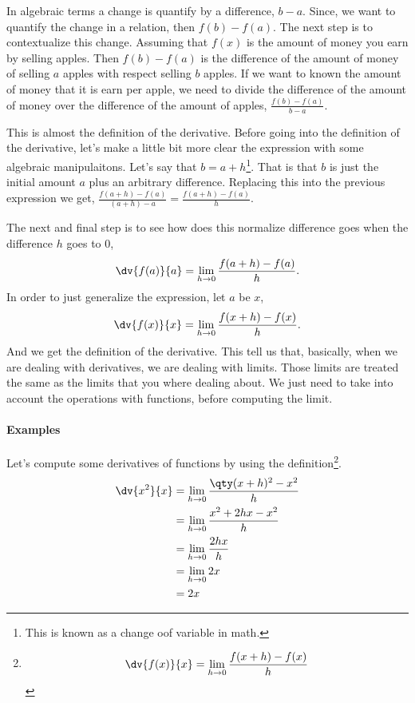 \documentclass[../main-notes.tex]{subfile}
\begin{document}
In algebraic terms a change is quantify by a difference, \(b-a\).
Since, we want to quantify the change in a relation, then \(f(b) - f(a)\).
The next step is to contextualize this change.
Assuming that $f(x)$ is the amount of money you earn by selling apples.
Then $f(b) - f(a)$ is the difference of the amount of money of selling $a$ apples with respect selling $b$ apples.
If we want to known the amount of money that it is earn per apple, we need to divide the difference of the amount of money over the difference of the amount of apples, \(\frac{f(b)-f(a)}{b-a}\).

This is almost the definition of the derivative.
Before going into the definition of the derivative, let's make a little bit more clear the expression with some algebraic manipulaitons.
Let's say that $b=a+h$\footnote{This is known as a change oof variable in math.}.
That is that $b$ is just the initial amount $a$ plus an arbitrary difference.
Replacing this into the previous expression we get, \(\frac{f(a+h) - f(a)}{(a+h)-a} = \frac{f(a+h) - f(a)}{h}\).

The next and final step is to see how does this normalize difference goes when the difference $h$ goes to $0$, 
\begin{gather}
    \dv{f(a)}{a} = \lim_{h\to0}\frac{f(a+h)-f(a)}{h}.
\end{gather}
In order to just generalize the expression, let $a$ be $x$,
\begin{gather}
    \dv{f(x)}{x} = \lim_{h\to0}\frac{f(x+h)-f(x)}{h}.
\end{gather}
And we get the definition of the derivative.
This tell us that, basically, when we are dealing with derivatives, we are dealing with limits.
Those limits are treated the same as the limits that you where dealing about.
We just need to take into account the operations with functions, before computing the limit.

\newpage

\paragraph{Examples} Let's compute some derivatives of functions by using the definition\footnote{
    \begin{gather*}
        \dv{f(x)}{x} = \lim_{h\to0}\frac{f(x+h)-f(x)}{h}
    \end{gather*}
}.
\begin{align*}
    \dv{x^2}{x} &= \lim_{h\to0}\frac{\qty(x+h)^2-x^2}{h} \\
                &= \lim_{h\to0}\frac{x^2 +2hx -x^2}{h} \\
                &= \lim_{h\to0}\frac{2hx}{h} \\
                &= \lim_{h\to0}2x \\
                &= 2x
\end{align*}
\end{document}
